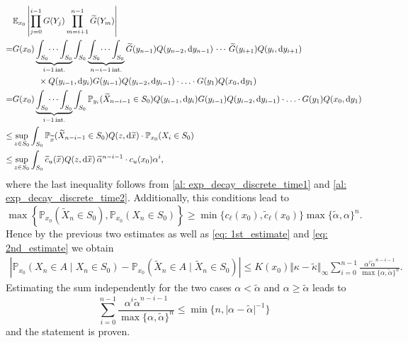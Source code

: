 \documentclass{aptpub}
\begin{document}
\begin{align*}
 	&	\mathbb{E}_{x_0} \left \vert \prod_{j=0}^{i-1}G(Y_j) \prod_{m=i+1}^{n-1} \widetilde{G}(Y_{m}) \right\vert\\
= & 	G(x_0) \underbrace{\int_{S_0} \dots \int_{S_0}}_{i-1 \text{\,int.}} \int_{S_0} 
			 \underbrace{\int_{S_0} \dots \int_{S_0}}_{n-i-1 \text{\,int.}}
			 \widetilde{G}(y_{n-1}) Q(y_{n-2},{\rm d}y_{n-1}) %
			 \,\cdots\,
			 \widetilde{G}(y_{i+1}) Q(y_i,{\rm d}y_{i+1})
			 \\
		 & \qquad \quad \times
			 	Q(y_{i-1},{\rm d} y_{i}) 
			 G(y_{i-1}) Q(y_{i-2},{\rm d}y_{i-1}) \cdot \ldots \cdot G(y_1) Q({x_0},{\rm d}y_1)\\
= & G({x_0}) \underbrace{\int_{S_0} \dots \int_{S_0}}_{i-1 \text{\,int.}} \int_{S_0} \mathbb{P}_{y_i}(\widetilde{X}_{n-i-1}\in S_0) Q(y_{i-1},{\rm d} y_{i}) 
G(y_{i-1}) Q(y_{i-2},{\rm d}y_{i-1}) \cdot \ldots \cdot G(y_1) Q({x_0},{\rm d}y_1)\\	
\leq & \sup_{z\in S_0} \int_{S_0} \mathbb{P}_{\widetilde{x}}(\widetilde{X}_{n-i-1}\in S_0) Q(z,{\rm d} \widetilde{x})  		 
 \cdot \mathbb{P}_{x_0}(X_{i}\in S_0) \\
\leq & \sup_{z\in S_0} \int_{S_0} \widetilde{c}_u(\widetilde{x}) Q(z,{\rm d}\widetilde{x})\, \widetilde{\alpha}^{n-i-1} \cdot c_u({x_0}) \alpha^{i}
 ,
\end{align*}
where the last inequality follows from \eqref{al: exp_decay_discrete_time1} and \eqref{al: exp_decay_discrete_time2}. Additionally, this conditions lead to \[
 \max\left\{\mathbb{P}_{x_0}(\widetilde{X}_n\in S_0),\mathbb{P}_{x_0}(X_n\in S_0)  \right\}	\geq \min\{ c_\ell({x_0}), \widetilde{c}_\ell({x_0}) \} \max\{\widetilde{\alpha},\alpha\}^n.
\]
Hence by the previous two estimates as well as \eqref{eq: 1st_estimate} and \eqref{eq: 2nd_estimate}  we obtain
\begin{align*}
	\left \vert \mathbb{P}_{x_0}(X_n\in A\mid X_n\in S_0) 
	- \mathbb{P}_{x_0}(\widetilde{X}_n\in A\mid \widetilde{X}_n\in S_0)\right \vert 
	\leq K({x_0}) \Vert \kappa-\widetilde{\kappa} \Vert_\infty	\sum_{i=0}^{n-1} \frac{\alpha^{i}\widetilde{\alpha}^{n-i-1}}{\max\{\alpha,\widetilde{\alpha}\}^n}. 
\end{align*}
Estimating the sum independently for the two cases $\alpha<\widetilde{\alpha}$
and $\alpha\geq\widetilde{\alpha}$ leads to
\[
	\sum_{i=0}^{n-1} \frac{\alpha^{i}\widetilde{\alpha}^{n-i-1}}{\max\{\alpha,\widetilde{\alpha}\}^n} \leq \min\{n,\vert \alpha-\widetilde{\alpha} \vert^{-1}\}
\]
and the statement is proven.
\end{document}
